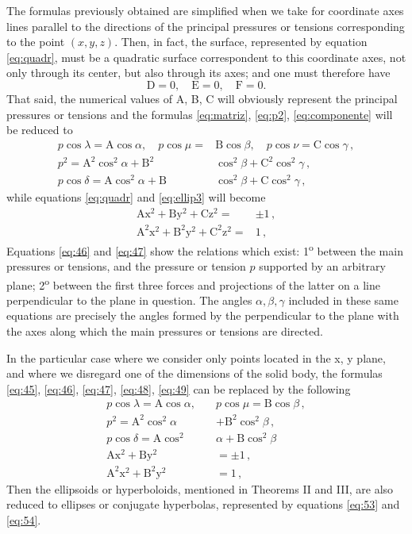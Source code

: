 \documentclass[leqno,openright,smallroyalvopaper,8pt,twoside,showtrims]{memoir}
\begin{document}
The formulas previously obtained are simplified when we take for coordinate axes lines parallel to the directions of the principal pressures or tensions corresponding to the point $(x, y, z)$. Then, in fact, the surface, represented by equation \eqref{eq:quadr}, must be a quadratic surface correspondent to this coordinate axes, not only through its center, but also through its axes; and one must therefore have
\begin{equation*}
\text{D}=0,\quad \text{E}=0,\quad \text{F}=0.
\end{equation*}
That said, the numerical values of A, B, C will obviously represent the principal pressures or tensions and the formulas \eqref{eq:matriz}, \eqref{eq:p2}, \eqref{eq:componente} will be reduced to
\begin{align}
p\cos\lambda=\text{A}\cos\alpha,\quad p\cos\mu=&\text{B}\cos\beta,\quad p\cos\nu=\text{C}\cos\gamma\label{eq:45}\,,\\
p^2=\text{A}^2\cos^2\alpha+\text{B}^2&\cos^2\beta+\text{C}^2\cos^2\gamma\,,\label{eq:46}\\
p\cos\delta=\text{A}\cos^2\alpha+\text{B}&\cos^2\beta+\text{C}\cos^2\gamma\,\label{eq:47},
\end{align}
while equations \eqref{eq:quadr} and \eqref{eq:ellip3} will become
\begin{align}
\text{A}\text{x}^2+\text{B}\text{y}^2+\text{C}\text{z}^2=&\pm 1\label{eq:48}\,,\\
\text{A}^2\text{x}^2+\text{B}^2\text{y}^2+\text{C}^2\text{z}^2=&1\label{eq:49}\,,
\end{align}
Equations \eqref{eq:46} and \eqref{eq:47} show the relations which exist: 1\textsuperscript{o} between the main pressures or tensions, and the pressure or tension $p$ supported by an arbitrary plane; 2\textsuperscript{o} between the first three
forces and projections of the latter on a line perpendicular to the plane in question. The angles $\alpha,\beta,\gamma$ included in these same equations are precisely the angles formed by the perpendicular to the plane with the axes along which the main pressures or tensions are directed.

In the particular case where we consider only points located in the x, y plane, and where we disregard one of the dimensions of the solid body, the formulas \eqref{eq:45}, \eqref{eq:46}, \eqref{eq:47}, \eqref{eq:48}, \eqref{eq:49} can be replaced by the following
\begin{align}
p\cos\lambda=\text{A}\cos\alpha,\quad &p\cos\mu=\text{B}\cos\beta\,,\\
p^2=\text{A}^2\cos^2\alpha&+\text{B}^2\cos^2\beta\,,\\
p\cos\delta=\text{A}\cos^2&\alpha+\text{B}\cos^2\beta\,\\
\text{A}\text{x}^2+\text{B}\text{y}^2&=\pm 1\,,\label{eq:53}\\
\text{A}^2\text{x}^2+\text{B}^2\text{y}^2&=1\,,\label{eq:54}
\end{align}
Then the ellipsoids or hyperboloids, mentioned in Theorems II and III, are also reduced to ellipses or conjugate hyperbolas, represented by equations \eqref{eq:53} and \eqref{eq:54}.
\end{document}
